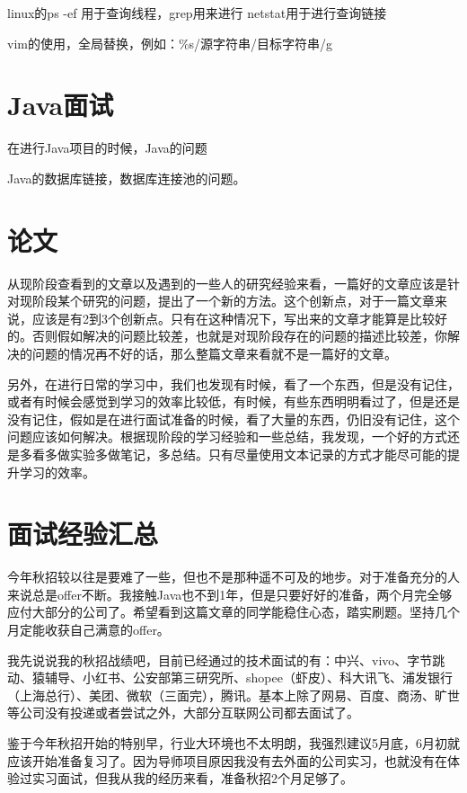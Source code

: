 \documentclass[UTF8]{ctexart}
\begin{document}
linux的ps -ef 用于查询线程，grep用来进行
netstat用于进行查询链接

vim的使用，全局替换，例如：\%s/源字符串/目标字符串/g

\section{Java面试}

在进行Java项目的时候，Java的问题

Java的数据库链接，数据库连接池的问题。



\section{论文}

从现阶段查看到的文章以及遇到的一些人的研究经验来看，一篇好的文章应该是针对现阶段某个研究的问题，提出了一个新的方法。这个创新点，对于一篇文章来说，应该是有2到3个创新点。只有在这种情况下，写出来的文章才能算是比较好的。否则假如解决的问题比较差，也就是对现阶段存在的问题的描述比较差，你解决的问题的情况再不好的话，那么整篇文章来看就不是一篇好的文章。

另外，在进行日常的学习中，我们也发现有时候，看了一个东西，但是没有记住，或者有时候会感觉到学习的效率比较低，有时候，有些东西明明看过了，但是还是没有记住，假如是在进行面试准备的时候，看了大量的东西，仍旧没有记住，这个问题应该如何解决。根据现阶段的学习经验和一些总结，我发现，一个好的方式还是多看多做实验多做笔记，多总结。只有尽量使用文本记录的方式才能尽可能的提升学习的效率。


\section{面试经验汇总}

今年秋招较以往是要难了一些，但也不是那种遥不可及的地步。对于准备充分的人来说总是offer不断。我接触Java也不到1年，但是只要好好的准备，两个月完全够应付大部分的公司了。希望看到这篇文章的同学能稳住心态，踏实刷题。坚持几个月定能收获自己满意的offer。

我先说说我的秋招战绩吧，目前已经通过的技术面试的有：中兴、vivo、字节跳动、猿辅导、小红书、公安部第三研究所、shopee（虾皮）、科大讯飞、浦发银行（上海总行）、美团、微软（三面完），腾讯。基本上除了网易、百度、商汤、旷世等公司没有投递或者尝试之外，大部分互联网公司都去面试了。

鉴于今年秋招开始的特别早，行业大环境也不太明朗，我强烈建议5月底，6月初就应该开始准备复习了。因为导师项目原因我没有去外面的公司实习，也就没有在体验过实习面试，但我从我的经历来看，准备秋招2个月足够了。
\end{document}
